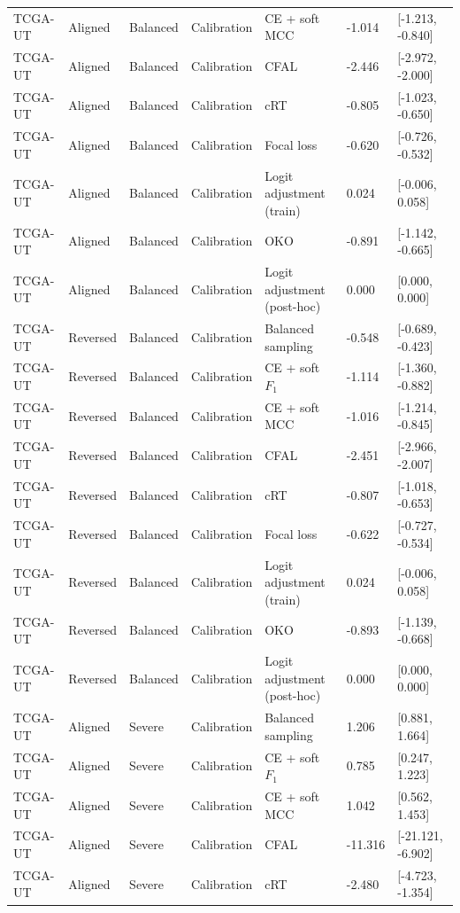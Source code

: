 \begin{longtable}{lllllll}
TCGA-UT & Aligned & Balanced & Calibration & CE + soft MCC & -1.014 & [-1.213, -0.840] \\
TCGA-UT & Aligned & Balanced & Calibration & CFAL & -2.446 & [-2.972, -2.000] \\
TCGA-UT & Aligned & Balanced & Calibration & cRT & -0.805 & [-1.023, -0.650] \\
TCGA-UT & Aligned & Balanced & Calibration & Focal loss & -0.620 & [-0.726, -0.532] \\
TCGA-UT & Aligned & Balanced & Calibration & Logit adjustment (train) & 0.024 & [-0.006, 0.058] \\
TCGA-UT & Aligned & Balanced & Calibration & OKO & -0.891 & [-1.142, -0.665] \\
TCGA-UT & Aligned & Balanced & Calibration & Logit adjustment (post-hoc) & 0.000 & [0.000, 0.000] \\
TCGA-UT & Reversed & Balanced & Calibration & Balanced sampling & -0.548 & [-0.689, -0.423] \\
TCGA-UT & Reversed & Balanced & Calibration & CE + soft $F_1$ & -1.114 & [-1.360, -0.882] \\
TCGA-UT & Reversed & Balanced & Calibration & CE + soft MCC & -1.016 & [-1.214, -0.845] \\
TCGA-UT & Reversed & Balanced & Calibration & CFAL & -2.451 & [-2.966, -2.007] \\
TCGA-UT & Reversed & Balanced & Calibration & cRT & -0.807 & [-1.018, -0.653] \\
TCGA-UT & Reversed & Balanced & Calibration & Focal loss & -0.622 & [-0.727, -0.534] \\
TCGA-UT & Reversed & Balanced & Calibration & Logit adjustment (train) & 0.024 & [-0.006, 0.058] \\
TCGA-UT & Reversed & Balanced & Calibration & OKO & -0.893 & [-1.139, -0.668] \\
TCGA-UT & Reversed & Balanced & Calibration & Logit adjustment (post-hoc) & 0.000 & [0.000, 0.000] \\
TCGA-UT & Aligned & Severe & Calibration & Balanced sampling & 1.206 & [0.881, 1.664] \\
TCGA-UT & Aligned & Severe & Calibration & CE + soft $F_1$ & 0.785 & [0.247, 1.223] \\
TCGA-UT & Aligned & Severe & Calibration & CE + soft MCC & 1.042 & [0.562, 1.453] \\
TCGA-UT & Aligned & Severe & Calibration & CFAL & -11.316 & [-21.121, -6.902] \\
TCGA-UT & Aligned & Severe & Calibration & cRT & -2.480 & [-4.723, -1.354] \\

\end{longtable}
